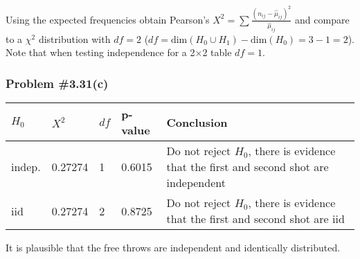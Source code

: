 \documentclass[12pt, letterpaper]{article}
\begin{document}
Using the expected frequencies obtain Pearson's $X^2 = \sum \frac{ \left( n_{ij} - \hat{\mu}_{ij} \right)^2 }{ \hat{\mu}_{ij} } $ and compare to a $\chi^2$ distribution with $df= 2$ ($df = \text{dim}(H_0 \cup H_1) - \text{dim}(H_0) = 3 - 1 = 2$).  Note that when testing independence for a 2$\times$2 table $df = 1$.   


\subsubsection*{Problem {\#}3.31(c)}

\tabulinesep=1mm
\begin{tabu}{X[l, .7] X[l, 1] X[l, .3] X[l, 1] X[l, 5]}  
\textbf{$H_0$} 	& $X^2$ 	& $df$  & \textbf{p-value}	& \textbf{Conclusion} \\ \hline 
	indep.		& 0.27274 	& 1 	& 0.6015 			& Do not reject $H_0$, there is evidence that the first and second shot are independent  \\ \hline
	iid			& 0.27274 	& 2 	& 0.8725 			& Do not reject $H_0$, there is evidence that the first and second shot are iid  \\\hline  
\end{tabu}

It is plausible that the free throws are independent and identically distributed.  
\end{document}
